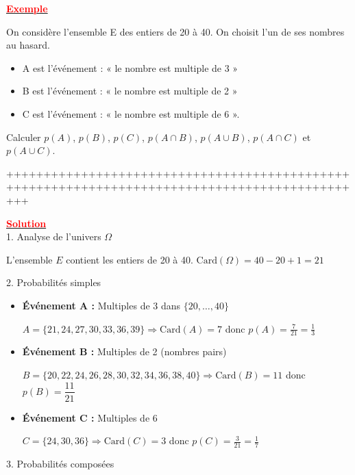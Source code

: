 \documentclass[12pt,a4paper]{article}
\begin{document}
\tiny

\underline{\textbf{\textcolor{red}{Exemple}}}

On considère l’ensemble E des entiers de 20 à 40. On choisit l’un de ses nombres au hasard.

\begin{itemize}
\item[•] A est l’événement : « le nombre est multiple de 3 »
\item[•] B est l’événement : « le nombre est multiple de 2 »
\item[•] C est l’événement : « le nombre est multiple de 6 ».
\end{itemize}
Calculer $p(A)$, $p(B)$, $p(C)$, $p(A\cap B)$, $p(A\cup B)$, $p(A\cap C)$ et $p(A\cup C)$.

+++++++++++++++++++++++++++++++++++++++++++++++++++++++++++++++++++++++++++++++++++++++++++++++

\underline{\textbf{\textcolor{red}{Solution}}}\\

1. Analyse de l'univers $\Omega$

L'ensemble $E$ contient les entiers de 20 à 40.
$\text{Card}(\Omega) = 40 - 20 + 1 = 21$

2. Probabilités simples

\begin{itemize}
    \item \textbf{Événement A :} Multiples de 3 dans $\{20, \dots, 40\}$
    
    $A = \{21, 24, 27, 30, 33, 36, 39\} \Rightarrow \text{Card}(A) = 7$ donc $ p(A) = \frac{7}{21} = \frac{1}{3}$

    \item \textbf{Événement B :} 
    Multiples de 2 (nombres pairs)
    
    $B = \{20, 22, 24, 26, 28, 30, 32, 34, 36, 38, 40\} \Rightarrow \text{Card}(B) = 11$ donc $ p(B) = \dfrac{11}{21}$

    \item \textbf{Événement C :} 
    Multiples de 6
    
    $C = \{24, 30, 36\} \Rightarrow \text{Card}(C) = 3$ donc $ p(C) = \frac{3}{21} = \frac{1}{7} $
\end{itemize}

3. Probabilités composées
\end{document}
